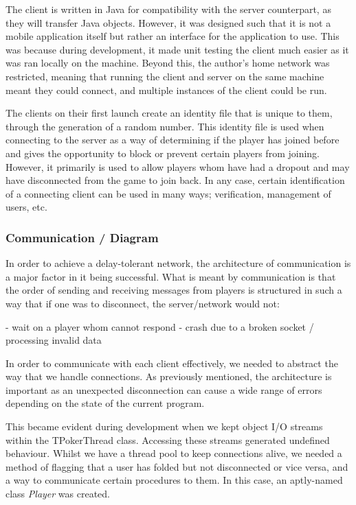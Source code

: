 \documentclass[11pt]{article}
\begin{document}
The client is written in Java for compatibility with the server counterpart, as they will transfer Java objects. However, it was designed such that it is not a mobile application itself but rather an interface for the application to use. This was because during development, it made unit testing the client much easier as it was ran locally on the machine. Beyond this, the author's home network was restricted, meaning that running the client and server on the same machine meant they could connect, and multiple instances of the client could be run. 

The clients on their first launch create an identity file that is unique to them, through the generation of a random number. This identity file is used when connecting to the server as a way of determining if the player has joined before and gives the opportunity to block or prevent certain players from joining. However, it primarily is used to allow players whom have had a dropout and may have disconnected from the game to join back. In any case, certain identification of a connecting client can be used in many ways; verification, management of users, etc.



\subsubsection{Communication / Diagram} %
In order to achieve a delay-tolerant network, the architecture of communication is a major factor in it being successful. What is meant by communication is that the order of sending and receiving messages from players is structured in such a way that if one was to disconnect, the server/network would not:

- wait on a player whom cannot respond
- crash due to a broken socket / processing invalid data

In order to communicate with each client effectively, we needed to abstract the way that we handle connections. As previously mentioned, the architecture is important as an unexpected disconnection can cause a wide range of errors depending on the state of the current program. %

This became evident during development when we kept object I/O streams within the TPokerThread class. Accessing these streams generated undefined behaviour. Whilst we have a thread pool to keep connections alive, we needed a method of flagging that a user has folded but not disconnected or vice versa, and a way to communicate certain procedures to them. In this case, an aptly-named class \textit{Player} was created. 
\end{document}
